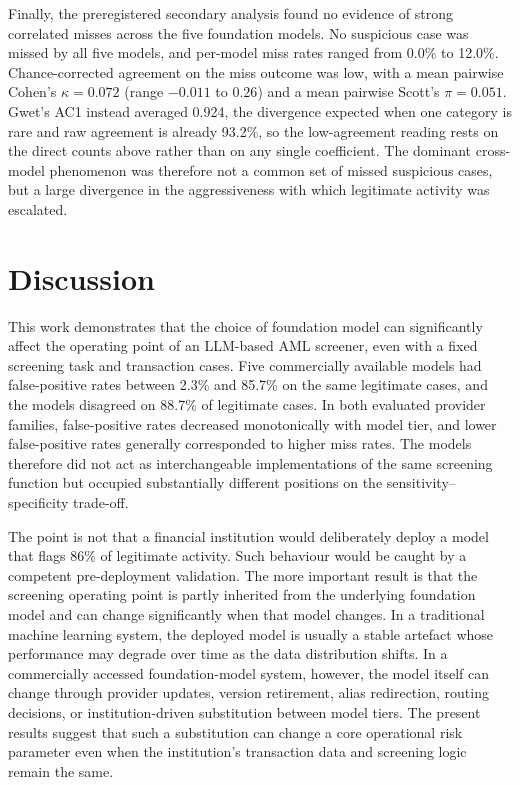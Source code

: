\documentclass[pdflatex,sn-basic,Numbered]{sn-jnl}
\begin{document}
Finally, the preregistered secondary analysis found no evidence of strong correlated misses across the five foundation models. No suspicious case was missed by all five models, and per-model miss rates ranged from 0.0\% to 12.0\%. Chance-corrected agreement on the miss outcome was low, with a mean pairwise Cohen's $\kappa = 0.072$ (range $-0.011$ to $0.26$) and a mean pairwise Scott's $\pi = 0.051$. Gwet's AC1 instead averaged 0.924, the divergence expected when one category is rare and raw agreement is already 93.2\%, so the low-agreement reading rests on the direct counts above rather than on any single coefficient. The dominant cross-model phenomenon was therefore not a common set of missed suspicious cases, but a large divergence in the aggressiveness with which legitimate activity was escalated.

\section{Discussion}\label{sec:discussion}

This work demonstrates that the choice of foundation model can significantly affect the operating point of an LLM-based AML screener, even with a fixed screening task and transaction cases. Five commercially available models had false-positive rates between 2.3\% and 85.7\% on the same legitimate cases, and the models disagreed on 88.7\% of legitimate cases. In both evaluated provider families, false-positive rates decreased monotonically with model tier, and lower false-positive rates generally corresponded to higher miss rates. The models therefore did not act as interchangeable implementations of the same screening function but occupied substantially different positions on the sensitivity--specificity trade-off.

The point is not that a financial institution would deliberately deploy a model that flags 86\% of legitimate activity. Such behaviour would be caught by a competent pre-deployment validation. The more important result is that the screening operating point is partly inherited from the underlying foundation model and can change significantly when that model changes. In a traditional machine learning system, the deployed model is usually a stable artefact whose performance may degrade over time as the data distribution shifts. In a commercially accessed foundation-model system, however, the model itself can change through provider updates, version retirement, alias redirection, routing decisions, or institution-driven substitution between model tiers. The present results suggest that such a substitution can change a core operational risk parameter even when the institution's transaction data and screening logic remain the same.
\end{document}
